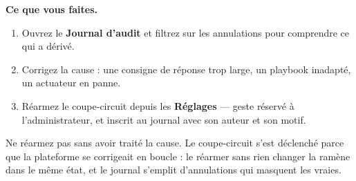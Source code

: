 \textbf{Ce que vous faites.}

\begin{enumerate}[leftmargin=*]
  \item Ouvrez le \textbf{Journal d'audit} et filtrez sur les annulations pour
        comprendre ce qui a dérivé.
  \item Corrigez la cause : une consigne de réponse trop large, un playbook
        inadapté, un actuateur en panne.
  \item Réarmez le coupe-circuit depuis les \textbf{Réglages} — geste réservé à
        l'administrateur, et inscrit au journal avec son auteur et son motif.
\end{enumerate}

\begin{tcolorbox}[colback=orange!5!white, colframe=orange!70!black,
  title=\textbf{Attention}, fonttitle=\bfseries, boxrule=0.6pt]
Ne réarmez pas sans avoir traité la cause. Le coupe-circuit s'est déclenché
parce que la plateforme se corrigeait en boucle : le réarmer sans rien changer
la ramène dans le même état, et le journal s'emplit d'annulations qui masquent
les vraies.
\end{tcolorbox}

